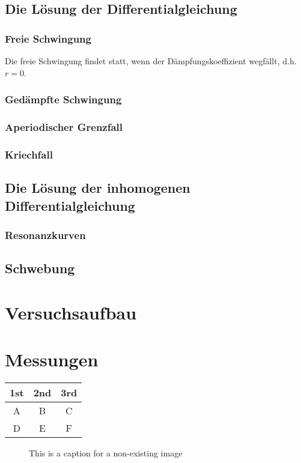 \documentclass{article}
\begin{document}
\subsection{Die Lösung der Differentialgleichung}
\subsubsection{Freie Schwingung}
Die freie Schwingung findet statt, wenn der Dämpfungskoeffizient wegfällt, d.h. $r = 0$.
\subsubsection{Gedämpfte Schwingung}
\subsubsection{Aperiodischer Grenzfall}
\subsubsection{Kriechfall}
\subsection{Die Lösung der inhomogenen Differentialgleichung}
\subsubsection{Resonanzkurven}
\subsection{Schwebung}
\clearpage

\section{Versuchsaufbau}
\cite{w:pohl}
\clearpage

\section{Messungen}
\begin{center}
\begin{tabular}{c c c}
    \hline
    1st & 2nd & 3rd \\
    \hline
    A & B & C \\
    D & E & F \\
    \hline
\end{tabular}

\begin{figure}
    \caption{This is a caption for a non-existing image}
    \end{figure}
\end{center}
\clearpage
\end{document}

